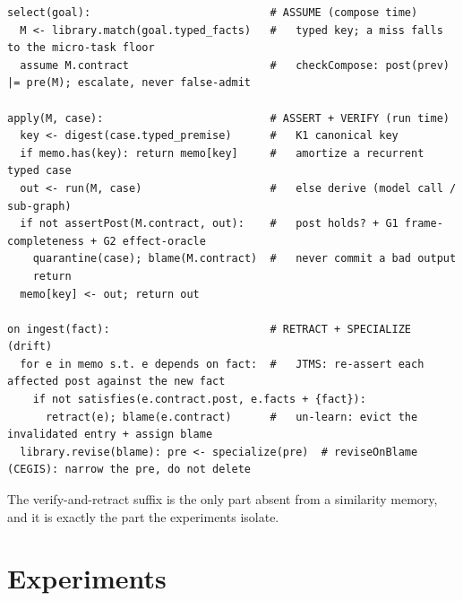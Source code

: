 \documentclass[11pt]{article}
\begin{document}
\begin{lstlisting}
select(goal):                            # ASSUME (compose time)
  M <- library.match(goal.typed_facts)   #   typed key; a miss falls to the micro-task floor
  assume M.contract                      #   checkCompose: post(prev) |= pre(M); escalate, never false-admit

apply(M, case):                          # ASSERT + VERIFY (run time)
  key <- digest(case.typed_premise)      #   K1 canonical key
  if memo.has(key): return memo[key]     #   amortize a recurrent typed case
  out <- run(M, case)                    #   else derive (model call / sub-graph)
  if not assertPost(M.contract, out):    #   post holds? + G1 frame-completeness + G2 effect-oracle
    quarantine(case); blame(M.contract)  #   never commit a bad output
    return
  memo[key] <- out; return out

on ingest(fact):                         # RETRACT + SPECIALIZE (drift)
  for e in memo s.t. e depends on fact:  #   JTMS: re-assert each affected post against the new fact
    if not satisfies(e.contract.post, e.facts + {fact}):
      retract(e); blame(e.contract)      #   un-learn: evict the invalidated entry + assign blame
  library.revise(blame): pre <- specialize(pre)  # reviseOnBlame (CEGIS): narrow the pre, do not delete
\end{lstlisting}

The verify-and-retract suffix is the only part absent from a similarity memory, and it is exactly the part the
experiments isolate.

\section{Experiments}
\end{document}
